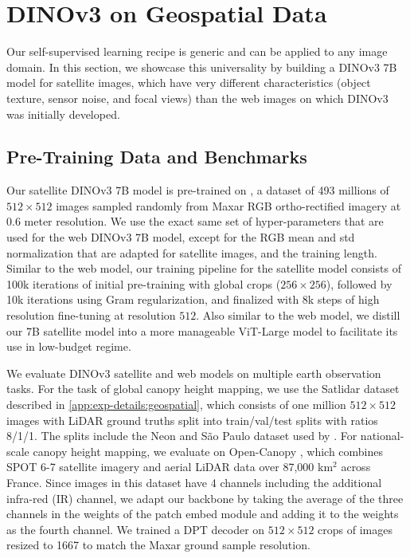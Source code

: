 \section{DINOv3 on Geospatial Data}
\label{sec:satellite}
Our self-supervised learning recipe is generic and can be applied to any image domain. In this section, we showcase this universality by building a DINOv3 7B model for satellite images, which have very different characteristics (\eg object texture, sensor noise, and focal views) than the web images on which DINOv3 was initially developed.

\subsection{Pre-Training Data and Benchmarks}


Our satellite DINOv3 7B model is pre-trained on \SATdataset, a dataset of 493 millions of $512\times512$ images sampled randomly from Maxar RGB ortho-rectified imagery at 0.6 meter resolution.
We use the exact same set of hyper-parameters that are used for the web DINOv3 7B model, except for the RGB mean and std normalization that are adapted for satellite images, and the training length. 
Similar to the web model, our training pipeline for the satellite model consists of 100k iterations of initial pre-training with global crops ($256\times 256$), followed by 10k iterations using Gram regularization, and finalized with 8k steps of high resolution fine-tuning at resolution $512$. 
Also similar to the web model, we distill our 7B satellite model into a more manageable ViT-Large model to facilitate its use in low-budget regime.

We evaluate DINOv3 satellite and web models on multiple earth observation tasks. For the task of global canopy height mapping, we use the Satlidar dataset described in \cref{app:exp-details:geospatial}, which consists of one million $512\times 512$ images with LiDAR ground truths split into train/val/test splits with ratios 8/1/1. The splits include the Neon and S\~{a}o Paulo dataset used by \citet{tolan2024very}.
For national-scale canopy height mapping, we evaluate on Open-Canopy \citep{fogel2025open}, which combines SPOT 6-7 satellite imagery and aerial LiDAR data over 87,000 km$^2$ across France.
Since images in this dataset have 4 channels including the additional infra-red (IR) channel, we adapt our backbone by taking the average of the three channels in the weights of the patch embed module and adding it to the weights as the fourth channel.
We trained a DPT decoder on $512\times 512$ crops of images resized to 1667 to match the Maxar ground sample resolution. %



